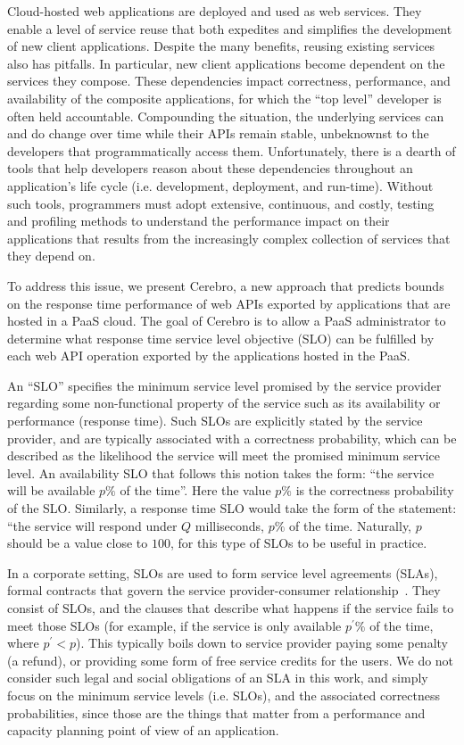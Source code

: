 Cloud-hosted web applications are deployed and used as web services. 
They enable a level of service reuse that both expedites
and simplifies the development of new client applications.
Despite the many benefits, reusing existing services also has pitfalls.  
In particular, new client applications become dependent on the 
services they compose.  These dependencies
impact correctness, performance, and availability of the composite 
applications, for which the ``top level'' developer is often held accountable.  
Compounding the situation, the underlying services can and do change over time
while their APIs remain stable,
unbeknownst to the developers that programmatically access them.
Unfortunately, there is a dearth of tools that help developers reason about these 
dependencies throughout an application's 
life cycle (i.e. development, deployment, and run-time).  Without such tools, 
programmers must adopt extensive, continuous, and costly, testing and profiling methods
to understand the performance impact on their applications
that results from the increasingly complex collection of
services that they depend on.

To address this issue, we present Cerebro, a new approach that 
predicts bounds on the response time performance of web
APIs exported by applications that are hosted in a PaaS cloud.
The goal of Cerebro is to allow 
a PaaS administrator to determine what response time service level objective (SLO) can be
fulfilled by each web API operation exported by the applications
hosted in the PaaS. 

An ``SLO'' specifies the minimum service level promised by the
service provider regarding some non-functional property of the service such as
its availability or performance (response time). 
Such SLOs are explicitly
stated by the service provider, and are typically associated with a correctness probability,
which can be described as the likelihood the service will meet the promised
minimum service level. An availability SLO that follows this notion
takes the form: ``the service will be available $p\%$ of the time''.
Here the value $p\%$ is the correctness probability of the SLO. Similarly, a
response time SLO would take the form of the statement: ``the service will respond 
under $Q$ milliseconds, $p\%$ of the time. Naturally, $p$ should be a value close
to $100$, for this type of SLOs to be useful in practice.

In a corporate setting, SLOs are used to form service level agreements (SLAs), 
formal contracts that govern the service provider-consumer relationship~\cite{Keller:2003:WFS:635430.635442}.
They consist of SLOs, and the clauses that describe what happens if the
service fails to meet those SLOs (for example, if the
service is only available $p^\prime\%$ of the time, where $p^\prime < p$). This
typically boils down to service provider paying some penalty (a refund), or 
providing some form of free service credits for the users. We do not consider such
legal and social obligations of an SLA in this work, and simply focus on the
minimum service levels (i.e. SLOs), and the associated correctness probabilities, since those
are the things that matter from a performance and capacity planning point of view
of an application. 

